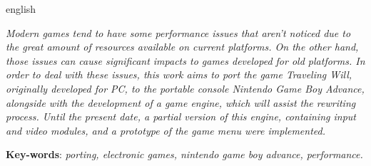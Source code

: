 \begin{resumo}[Abstract]
  \begin{otherlanguage*}{english}

    \textit{Modern games tend to have some performance issues that aren’t noticed due to the great amount of resources available on current platforms. On the other hand, those issues can cause significant impacts to games developed for old platforms. In order to deal with these issues, this work aims to port the game Traveling Will, originally developed for PC, to the portable console Nintendo Game Boy Advance, alongside with the development of a game engine, which will assist the rewriting process. Until the present date, a partial version of this engine, containing input and video modules, and a prototype of the game menu were implemented.}

    \vspace{\onelineskip}

    \noindent
    \textbf{Key-words}: \textit{porting, electronic games, nintendo game boy advance, performance.}
  \end{otherlanguage*}
\end{resumo}
